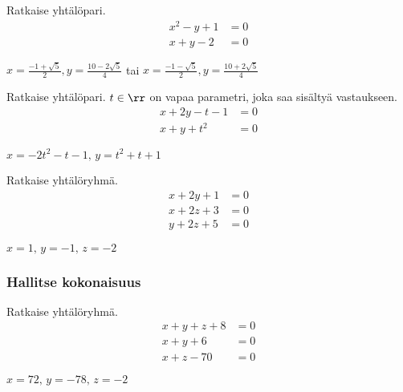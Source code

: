 \begin{tehtavasivu}
\begin{tehtava}
	Ratkaise yhtälöpari.
	\begin{align*}
		x^2-y+1 &= 0 \\
		x+y-2 &= 0
	\end{align*}
	\begin{vastaus}
		$x = \frac{-1+\sqrt{5}}{2}, y = \frac{10-2\sqrt{5}}{4}$ tai $x = \frac{-1-\sqrt{5}}{2}, y = \frac{10+2\sqrt{5}}{4}$
	\end{vastaus}
\end{tehtava}

\begin{tehtava}
    Ratkaise yhtälöpari. $t \in \rr$ on vapaa parametri, joka saa sisältyä vastaukseen.
    \begin{align*}
        x+2y-t-1 &= 0 \\
        x+y+t^2 &=0
    \end{align*}
    \begin{vastaus}
        $x = -2t^2-t-1, \, y = t^2+t+1$
    \end{vastaus}
\end{tehtava}

\begin{tehtava}
    Ratkaise yhtälöryhmä.   
    \begin{align*}
        x+2y+1 &=0 \\
        x+2z+3 &=0 \\
        y+2z+5 &=0
    \end{align*}
    \begin{vastaus}
        $x = 1, \, y = -1, \, z = -2$
    \end{vastaus}
\end{tehtava}

\subsubsection*{Hallitse kokonaisuus}

\begin{tehtava}
    Ratkaise yhtälöryhmä.
    \begin{align*}
        x+y+z+8 &= 0 \\
        x+y+6 &=0 \\
        x+z-70 &=0
    \end{align*}
    \begin{vastaus}
        $x = 72, \, y = -78, \, z = -2$
    \end{vastaus}
\end{tehtava}


\end{tehtavasivu}
